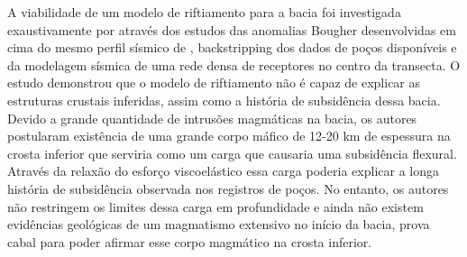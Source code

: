 A viabilidade de um modelo de riftiamento para a bacia foi investigada exaustivamente por \cite{tozer_crustal_2017} através dos estudos das anomalias Bougher desenvolvidas em cima do mesmo perfil sísmico de \cite{daly_brasiliano_2014}, backstripping dos dados de poços disponíveis e da modelagem sísmica de uma rede densa de receptores no centro da transecta. O estudo demonstrou que o modelo de riftiamento não é capaz de explicar as estruturas crustais inferidas, assim como a história de subsidência dessa bacia. Devido a grande quantidade de intrusões magmáticas na bacia, os autores postularam existência de uma grande corpo máfico de 12-20 km de espessura na crosta inferior que serviria como um carga que causaria uma subsidência flexural. Através da relaxão do esforço viscoelástico essa carga poderia explicar a longa história de subsidência observada nos registros de poços. No entanto, os autores não restringem os limites dessa carga em profundidade e ainda não existem evidências geológicas de um magmatismo extensivo no início da bacia, prova cabal para poder afirmar esse corpo magmático na crosta inferior.